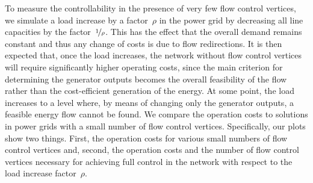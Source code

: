 To measure the controllability in the presence of very few flow control
vertices, we simulate a load increase by a factor~$\rho$ in the power grid by
decreasing all line capacities by the factor~$\nicefrac{1}{\rho}$. This has the
effect that the overall demand remains constant and thus any change of costs is
due to flow redirections.  It is then expected that, once the load increases,
the network without flow control vertices will require significantly higher
operating costs, since the main criterion for determining the generator outputs
becomes the overall feasibility of the flow rather than the cost-efficient
generation of the energy.  At some point, the load increases to a level where,
by means of changing only the generator outputs, a feasible energy flow cannot
be found.  We compare the operation costs to solutions in power grids with a
small number of flow control vertices.  Specifically, our plots show two things.
First, the operation costs for various small numbers of flow control vertices
and, second, the operation costs and the number of flow control vertices
necessary for achieving full control in the network with respect to the load
increase factor~$\rho$.

